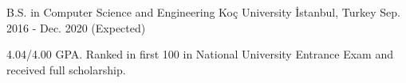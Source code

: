 
\vspace*{-1.5mm}

\begin{cventries}
 \cventry
    {B.S. in Computer Science and Engineering}
    {Koç University}
    {İstanbul, Turkey}
    {Sep. 2016 - Dec. 2020 (Expected)}
    {
      \begin{cvitems}
	\item {4.04/4.00 GPA. Ranked in first 100 in National University Entrance Exam and received full scholarship.}
      \end{cvitems}
    }
\end{cventries}
